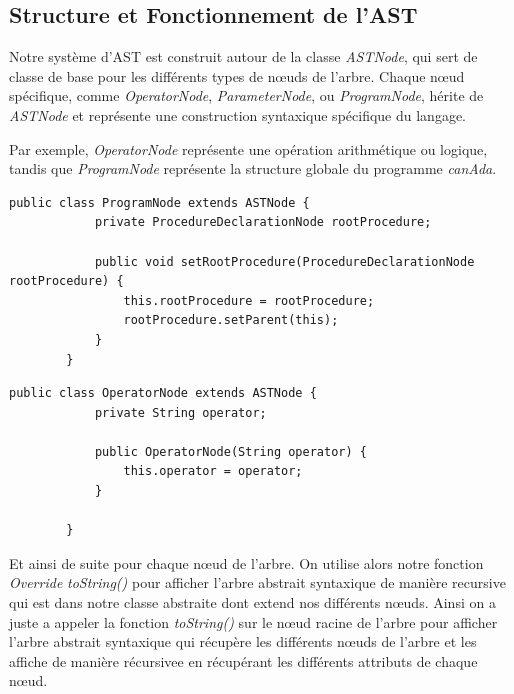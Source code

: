 \documentclass[french,a4paper]{article}
\begin{document}
    \subsection{Structure et Fonctionnement de l'AST}\label{subsec:structure-et-fonctionnement-de-l'ast}

    Notre système d'AST est construit autour de la classe \textit{ASTNode}, qui sert de classe de base pour les différents types de nœuds de l'arbre.
    Chaque nœud spécifique, comme \textit{OperatorNode}, \textit{ParameterNode}, ou \textit{ProgramNode}, hérite de \textit{ASTNode} et représente une construction syntaxique spécifique du langage.

    Par exemple, \textit{OperatorNode} représente une opération arithmétique ou logique, tandis que \textit{ProgramNode} représente la structure globale du programme \textit{canAda}.

    \begin{lstlisting}[label={lst:lstlisting13}]
        public class ProgramNode extends ASTNode {
            private ProcedureDeclarationNode rootProcedure;

            public void setRootProcedure(ProcedureDeclarationNode rootProcedure) {
                this.rootProcedure = rootProcedure;
                rootProcedure.setParent(this);
            }
        }
    \end{lstlisting}

    \begin{lstlisting}[label={lst:lstlisting15}]
        public class OperatorNode extends ASTNode {
            private String operator;

            public OperatorNode(String operator) {
                this.operator = operator;
            }

        }
    \end{lstlisting}

    Et ainsi de suite pour chaque nœud de l'arbre.
    On utilise alors notre fonction \textit{Override} \textit{toString()} pour afficher l'arbre abstrait syntaxique de manière recursive qui est dans notre classe abstraite dont extend nos différents nœuds.
    Ainsi on a juste a appeler la fonction \textit{toString()} sur le nœud racine de l'arbre pour afficher l'arbre abstrait syntaxique qui récupère les différents nœuds de l'arbre et les affiche de manière récursivee en récupérant les différents attributs de chaque nœud.
\end{document}
